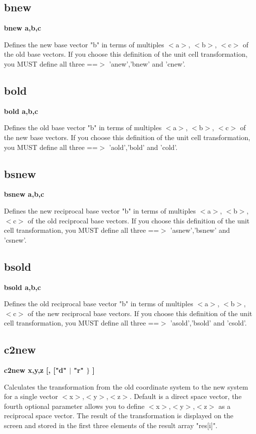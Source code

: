 \subsection*{bnew}
{\bf bnew a,b,c \par }
\par
\vspace{3pt}
Defines the new base vector "b" in terms of multiples $ <$a$> $, $ <$b$> $, $ <$c$> $ of 
the old base vectors. 
If you choose this definition of the unit cell transformation, you MUST 
define all three ==$> $ 'anew','bnew' and 'cnew'. 
\subsection*{bold}
{\bf bold a,b,c \par }
\par
\vspace{3pt}
Defines the old base vector "b" in terms of multiples $ <$a$> $, $ <$b$> $, $ <$c$> $ of 
the new base vectors. 
If you choose this definition of the unit cell transformation, you MUST 
define all three ==$> $ 'aold','bold' and 'cold'. 
\subsection*{bsnew}
{\bf bsnew a,b,c \par }
\par
\vspace{3pt}
Defines the new reciprocal base vector "b" in terms of 
multiples $ <$a$> $, $ <$b$> $, $ <$c$> $ of the old reciprocal base vectors. 
If you choose this definition of the unit cell transformation, you MUST 
define all three ==$> $ 'asnew','bsnew' and 'csnew'. 
\subsection*{bsold}
{\bf bsold a,b,c \par }
\par
\vspace{3pt}
Defines the old reciprocal base vector "b" in terms of 
multiples $ <$a$> $, $ <$b$> $, $ <$c$> $ of the new reciprocal base vectors. 
If you choose this definition of the unit cell transformation, you MUST 
define all three ==$> $ 'asold','bsold' and 'csold'. 
\subsection*{c2new}
{\bf c2new x,y,z [, ["d" $| $ "r" $\} $ ] \par }
\vspace{3pt}
Calculates the transformation from the old coordinate system to the new 
system for a single vector $ <$x$> $,$ <$y$> $,$ <$z$> $. Default is a direct space vector, 
the fourth optional parameter allows you to define $ <$x$> $,$ <$y$> $,$ <$z$> $ as a 
reciprocal space vector. The result of the transformation is displayed 
on the screen and stored in the first three elements of the result array 
"res[i]". 

